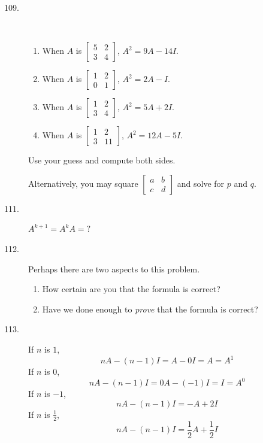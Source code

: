 \documentclass{article}
\begin{document}
\begin{description}
  \item[109.] $\ $
    \begin{enumerate}[\hspace{1cm}(1)]
      \item When $A$ is $\begin{bmatrix} 5 & 2 \\ 3 & 4 \end{bmatrix}$, $A^2 = 9A - 14I$.
      \item When $A$ is $\begin{bmatrix} 1 & 2 \\ 0 & 1 \end{bmatrix}$, $A^2 = 2A - I$.
      \item When $A$ is $\begin{bmatrix} 1 & 2 \\ 3 & 4 \end{bmatrix}$, $A^2 = 5A + 2I$.
      \item When $A$ is $\begin{bmatrix} 1 & 2 \\ 3 & 11 \end{bmatrix}$, $A^2 = 12A - 5I$.
    \end{enumerate}
    Use your guess and compute both sides.

    Alternatively, you may square $\begin{bmatrix} a & b \\ c & d \end{bmatrix}$ and solve for $p$ and $q$.

  \item[111.] $A^{k+1} = A^k A = ?$

  \item[112.] Perhaps there are two aspects to this problem. 
    \begin{enumerate}[\hspace{1cm}(1)]
      \item How certain are you that the formula is correct?
      \item Have we done enough to \emph{prove} that the formula is correct?
    \end{enumerate}

  \item[113.] If $n$ is $1$, 
    \begin{equation*}
    nA-(n-1)I = A-0I = A = A^1
    \end{equation*}
    If $n$ is $0$,
    \begin{equation*}
    nA-(n-1)I = 0A-(-1)I = I = A^0
    \end{equation*}
    If $n$ is $-1$,
    \begin{equation*}
    nA-(n-1)I = -A+2I
    \end{equation*}
    If $n$ is $\frac{1}{2}$,
    \begin{equation*}
    nA-(n-1)I = \frac{1}{2} A+ \frac{1}{2} I
    \end{equation*}


\end{description}
\end{document}
